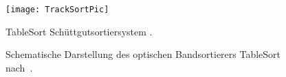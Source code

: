 \begin{figure}[h]
	\texttt{[image: TrackSortPic]}
	\caption{TableSort Schüttgutsortiersystem \cite{fraunhoferiosb2017}.}
	\label{fig:tablesortsystem}
\end{figure}


\begin{figure}[h]
    \centering
    \def\svgwidth{\columnwidth}
	
	\caption[Schematische Darstellung des optischen Bandsortierers TableSort nach~\cite{Pfaff2017}.]{
		Schematische Darstellung des optischen Bandsortierers TableSort nach~\cite{Pfaff2017}.
	}
	\label{fig:aufbau_tablesort}

\end{figure}


